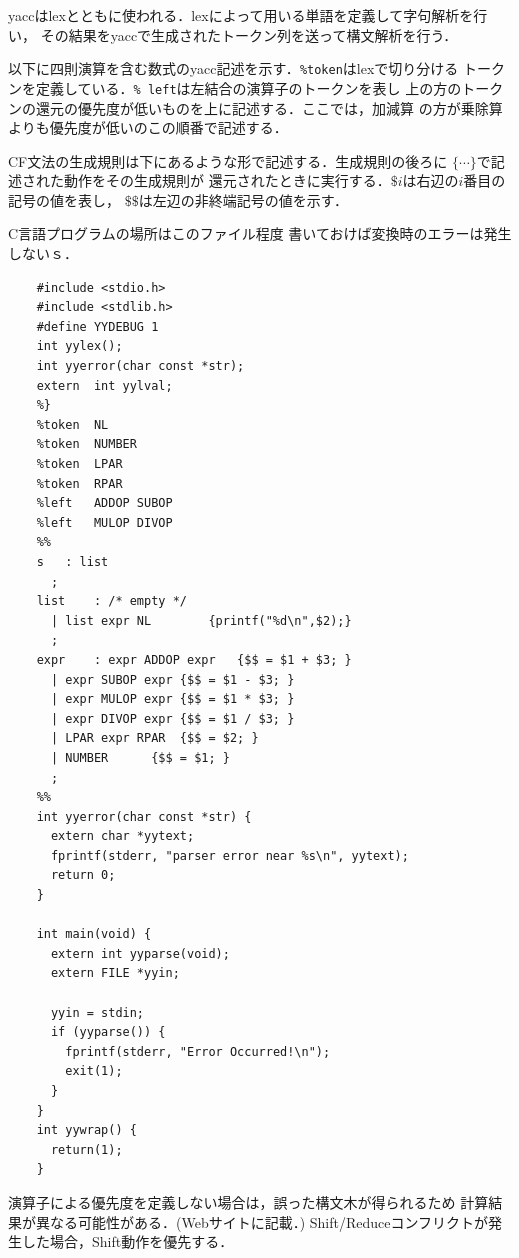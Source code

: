 \documentclass[dvipdfmx,a4j]{jbook}
\begin{document}
yaccはlexとともに使われる．lexによって用いる単語を定義して字句解析を行い，
その結果をyaccで生成されたトークン列を送って構文解析を行う．

以下に四則演算を含む数式のyacc記述を示す．\texttt{\%token}はlexで切り分ける
トークンを定義している．\texttt{\% left}は左結合の演算子のトークンを表し
上の方のトークンの還元の優先度が低いものを上に記述する．ここでは，加減算
の方が乗除算よりも優先度が低いのこの順番で記述する．

CF文法の生成規則は下にあるような形で記述する．生成規則の後ろに
$\texttt{\{}\cdots\texttt{\}}$で記述された動作をその生成規則が
還元されたときに実行する．$\texttt{\$}i$は右辺の$i$番目の記号の値を表し，
$\texttt{\$\$}$は左辺の非終端記号の値を示す．

C言語プログラムの場所はこのファイル程度
書いておけば変換時のエラーは発生しないｓ．

\begin{Verbatim}[frame=single]
  %{
    #include <stdio.h>
    #include <stdlib.h>
    #define	YYDEBUG 1
    int	yylex();
    int	yyerror(char const *str);
    extern  int yylval;
    %}
    %token	NL
    %token	NUMBER
    %token	LPAR
    %token	RPAR
    %left	ADDOP SUBOP
    %left	MULOP DIVOP
    %%
    s	: list
      ;
    list	: /* empty */
      | list expr NL		{printf("%d\n",$2);}
      ;
    expr	: expr ADDOP expr	{$$ = $1 + $3; }
      | expr SUBOP expr	{$$ = $1 - $3; }
      | expr MULOP expr	{$$ = $1 * $3; }
      | expr DIVOP expr	{$$ = $1 / $3; }
      | LPAR expr RPAR	{$$ = $2; }
      | NUMBER		{$$ = $1; }
      ;
    %%
    int yyerror(char const *str) {
      extern char *yytext;
      fprintf(stderr, "parser error near %s\n", yytext);
      return 0;
    }
    
    int main(void) {
      extern int yyparse(void);
      extern FILE *yyin;
    
      yyin = stdin;
      if (yyparse()) {
        fprintf(stderr, "Error Occurred!\n");
        exit(1);
      }
    }
    int yywrap() {
      return(1);
    }
\end{Verbatim}

演算子による優先度を定義しない場合は，誤った構文木が得られるため
計算結果が異なる可能性がある．(Webサイトに記載．)
Shift/Reduceコンフリクトが発生した場合，Shift動作を優先する．



\end{document}
